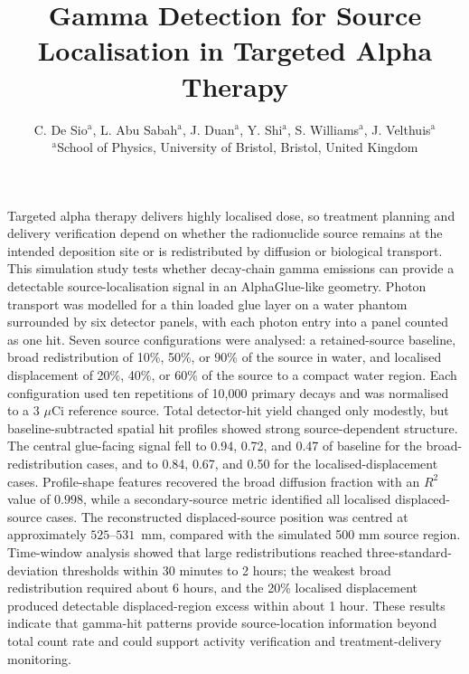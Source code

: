 \documentclass[11pt,a4paper]{article}
\title{Gamma Detection for Source Localisation in Targeted Alpha Therapy}
\author{
C. De Sio$^{\text{a}}$,
L. Abu Sabah$^{\text{a}}$,
J. Duan$^{\text{a}}$,
Y. Shi$^{\text{a}}$,
S. Williams$^{\text{a}}$,
J. Velthuis$^{\text{a}}$\\
\vspace{0.3em}
\small $^{\text{a}}$School of Physics, University of Bristol, Bristol, United Kingdom
}
\date{}
\begin{document}
\maketitle

Targeted alpha therapy delivers highly localised dose, so treatment planning and delivery verification depend on whether the radionuclide source remains at the intended deposition site or is redistributed by diffusion or biological transport. 
This simulation study tests whether decay-chain gamma emissions can provide a detectable source-localisation signal in an AlphaGlue-like geometry. 
Photon transport was modelled for a thin loaded glue layer on a water phantom surrounded by six detector panels, with each photon entry into a panel counted as one hit. 
Seven source configurations were analysed: a retained-source baseline, broad redistribution of 10\%, 50\%, or 90\% of the source in water, and localised displacement of 20\%, 40\%, or 60\% of the source to a compact water region. 
Each configuration used ten repetitions of 10,000 primary decays and was normalised to a 3 $\mu$Ci reference source. 
Total detector-hit yield changed only modestly, but baseline-subtracted spatial hit profiles showed strong source-dependent structure. 
The central glue-facing signal fell to 0.94, 0.72, and 0.47 of baseline for the broad-redistribution cases, and to 0.84, 0.67, and 0.50 for the localised-displacement cases. 
Profile-shape features recovered the broad diffusion fraction with an $R^2$ value of $0.998$, while a secondary-source metric identified all localised displaced-source cases. 
The reconstructed displaced-source position was centred at approximately $525$--$531$~mm, compared with the simulated 500 mm source region. 
Time-window analysis showed that large redistributions reached three-standard-deviation thresholds within 30 minutes to 2 hours; the weakest broad redistribution required about 6 hours, and the 20\% localised displacement produced detectable displaced-region excess within about 1 hour. 
These results indicate that gamma-hit patterns provide source-location information beyond total count rate and could support activity verification and treatment-delivery monitoring.
\end{document}
